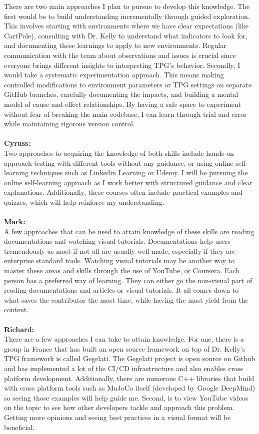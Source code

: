 \documentclass[12pt, titlepage]{article}
\begin{document}
\noindent There are two main approaches I plan to pursue to develop this knowledge. The first would be to build understanding incrementally through guided exploration. This involves starting with environments where we have clear expectations (like CartPole), consulting with Dr. Kelly to understand what indicators to look for, and documenting these learnings to apply to new environments. Regular communication with the team about observations and issues is crucial since everyone brings different insights to interpreting TPG's behavior.
Secondly, I would take a systematic experimentation approach. This means making controlled modifications to environment parameters or TPG settings on separate GitHub branches, carefully documenting the impacts, and building a mental model of cause-and-effect relationships. By having a safe space to experiment without fear of breaking the main codebase, I can learn through trial and error while maintaining rigorous version control.
\\\\

\noindent \textbf{Cyruss:}\\

\noindent Two approaches to acquiring the knowledge of both skills include hands-on approach testing with different tools without any guidance, or using online self-learning techniques such as Linkedin Learning or Udemy. I will be pursuing the online self-learning approach as I work better with structured guidance and clear explanations. Additionally, these courses often include practical examples and quizzes, which will help reinforce my understanding.
\\\\
\textbf{Mark:}
\\
A few approaches that can be used to attain knowledge of these skills are reading documentations and watching visual tutorials. Documentations help users tremendously as most if not all are usually well made, especially if they are enterprise standard tools. Watching visual tutorials may be another way to master these areas and skills through the use of YouTube, or Coursera. Each person has a preferred way of learning. They can either go the non-visual part of reading documentations and articles or visual tutorials. It all comes down to what saves the contributor the most time, while having the most yield from the content.
\\\\
\textbf{Richard:}\\

\noindent There are a few approaches I can take to attain knowledge. For one, there is a group in France that has built an open source framework on top of Dr. Kelly's TPG framework is called Gegelati. The Gegelati project is open source on Github and has implemented a lot of the CI/CD infrastructure and also enables cross platform development. Additionally, there are numerous C++ libraries that build with cross platform tools such as MuJoCo itself (developed by Google DeepMind) so seeing those examples will help guide me. Second, is to view YouTube videos on the topic to see how other developers tackle and approach this problem. Getting more opinions and seeing best practices in a visual format will be beneficial. 
\end{document}
